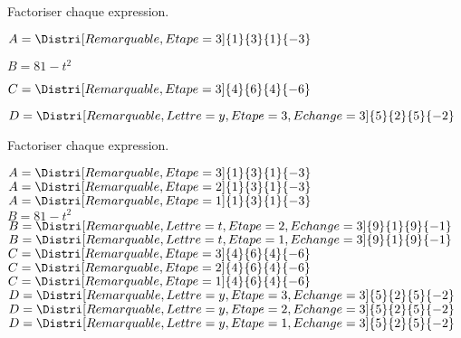 \begin{exercice*}
    Factoriser chaque expression.
    \begin{itemize}
         \begin{spacing}{1.2}
             \item[] $A= \Distri[Remarquable,Etape=3]{1}{3}{1}{-3}$
             \item[] $B= 81-t^2$
             \item[] $C= \Distri[Remarquable,Etape=3]{4}{6}{4}{-6}$
             \item[] $D= \Distri[Remarquable,Lettre=y,Etape=3,Echange=3]{5}{2}{5}{-2}$
         \end{spacing}
    \end{itemize}
\end{exercice*}
\begin{corrige}
    Factoriser chaque expression.
    \begin{itemize}
         \begin{spacing}{1.2}
            \def\item{}
            \item $A= \Distri[Remarquable,Etape=3]{1}{3}{1}{-3}$\\
            {\red 
            $A=\Distri[Remarquable,Etape=2]{1}{3}{1}{-3}$\\
            $A=\Distri[Remarquable,Etape=1]{1}{3}{1}{-3}$}\\             
             \item $B= 81-t^2$\\
             {\red 
             $B=\Distri[Remarquable,Lettre=t,Etape=2,Echange=3]{9}{1}{9}{-1}$\\
             $B=\Distri[Remarquable,Lettre=t,Etape=1,Echange=3]{9}{1}{9}{-1}$}\\
             \item $C= \Distri[Remarquable,Etape=3]{4}{6}{4}{-6}$\\
             {\red 
             $C=\Distri[Remarquable,Etape=2]{4}{6}{4}{-6}$\\
             $C=\Distri[Remarquable,Etape=1]{4}{6}{4}{-6}$}\\                          
             \item $D= \Distri[Remarquable,Lettre=y,Etape=3,Echange=3]{5}{2}{5}{-2}$\\
             {\red 
             $D=\Distri[Remarquable,Lettre=y,Etape=2,Echange=3]{5}{2}{5}{-2}$\\
             $D=\Distri[Remarquable,Lettre=y,Etape=1,Echange=3]{5}{2}{5}{-2}$}\\            
         \end{spacing}
    \end{itemize}
\end{corrige}

